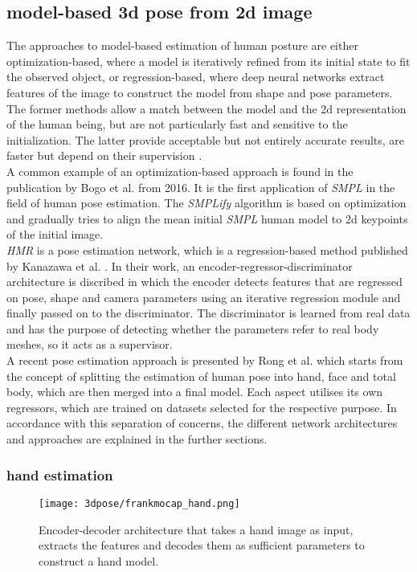 \subsection{model-based 3d pose from 2d image}
The approaches to model-based estimation of human posture are either optimization-based, where a model is iteratively refined from its initial state to fit the observed object, or regression-based, where deep neural networks extract features of the image to construct the model from shape and pose parameters. The former methods allow a match between the model and the 2d representation of the human being, but are not particularly fast and sensitive to the initialization. The latter provide acceptable but not entirely accurate results, are faster but depend on their supervision \cite{spin}. \\
A common example of an optimization-based approach is found in the publication by Bogo et al. \cite{simplify} from 2016. It is the first application of \emph{SMPL} in the field of human pose estimation. The \emph{SMPLify} algorithm is based on optimization and gradually tries to align the mean initial \emph{SMPL} human model to 2d keypoints of the initial image. \\
\emph{HMR} is a pose estimation network, which is a regression-based method published by Kanazawa et al. \cite{hmr}. In their work, an encoder-regressor-discriminator architecture is discribed in which the encoder detects features that are regressed on pose, shape and camera parameters using an iterative regression module and finally passed on to the discriminator. The discriminator is learned from real data and has the purpose of detecting whether the parameters refer to real body meshes, so it acts as a supervisor.\\

A recent pose estimation approach is presented by Rong et al. \cite{frankmocap} which starts from the concept of splitting the estimation of human pose into hand, face and total body, which are then merged into a final model. Each aspect utilises its own regressors, which are trained on datasets selected for the respective purpose. In accordance with this separation of concerns, the different network architectures and approaches are explained in the further sections.

\subsubsection{hand estimation}
\begin{figure}[h]
	\centering
	\texttt{[image: 3dpose/frankmocap\_hand.png]}
	\caption{Encoder-decoder architecture that takes a hand image as input, extracts the features and decodes them as sufficient parameters to construct a hand model.\cite{frankmocap}}
	\label{fig:frankmocap_hand}
\end{figure}

